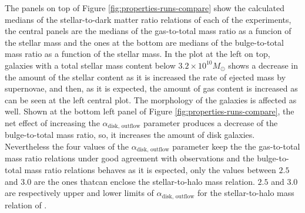 \documentclass[usenatbib]{mn2e}
\begin{document}
The panels on top of Figure \ref{fig:properties-runs-compare} show the
calculated medians of the stellar-to-dark matter ratio relations of
each of the experiments, the central panels are the medians of the
gas-to-total mass ratio as a funcion of the stellar mass and the ones
at the bottom are medians of the bulge-to-total mass ratio as a
function of the stellar mass. In the plot at the left on top, galaxies
with a total stellar mass content below $3.2\times 10^{10}M_{\odot}$
shows a decrease in the amount of the stellar content as it is
increased the rate of ejected mass by supernovae, and then, as it is
expected, the amount of gas content is increased as can be seen at the
left central plot. The morphology of the galaxies is affected as
well. Shown at the bottom left panel of Figure
\ref{fig:properties-runs-compare}, the net effect of increasing the
$\alpha_{\text{disk, outflow}}$ parameter produces a decrease of the
bulge-to-total mass ratio, so, it increases the amount of disk
galaxies. Nevertheless the four values of the $\alpha_{\text{disk,
    outflow}}$ parameter keep the the gas-to-total mass ratio
relations under good agreement with observations and the
bulge-to-total mass ratio relations behaves as it is espected, only
the values between $2.5$  and $3.0$ are the ones thatcan enclose the
stellar-to-halo mass relation. $2.5$  and $3.0$ are respectively
upper and lower limits of $\alpha_{\text{disk, outflow}}$ for the
stellar-to-halo mass relation of \cite{2010ApJ...710..903M}. 
\end{document}
